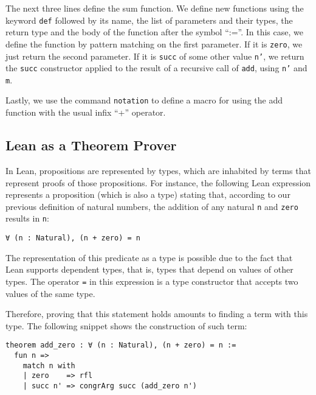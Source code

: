 The next three lines define the sum function. We define new functions using the keyword \texttt{def} followed by its name, the list of parameters and their types, the return type and the body of the function after the symbol ``:=''. In this case, we define the function by pattern matching on the first parameter. If it is \texttt{zero}, we just return the second parameter. If it is \texttt{succ} of some other value \texttt{n'}, we return the \texttt{succ} constructor applied to the result of a recursive call of \texttt{add}, using \texttt{n'} and \texttt{m}.

Lastly, we use the command \texttt{notation} to define a macro for using the add function with the usual infix ``+'' operator.



\subsection{Lean as a Theorem Prover}

In Lean, propositions are represented by types, which are inhabited by terms that represent proofs of those propositions. For instance, the following Lean expression represents a proposition (which is also a type) stating that, according to our previous definition of natural numbers, the addition of any natural \texttt{n} and \texttt{zero} results in \texttt{n}:

\begin{verbatim}
∀ (n : Natural), (n + zero) = n
\end{verbatim}

The representation of this predicate as a type is possible due to the fact that Lean supports dependent types, that is, types that depend on values of other types. The operator \texttt{=} in this expression is a type constructor that accepts two values of the same type.

Therefore, proving that this statement holds amounts to finding a term with this type. The following snippet shows the construction of such term:

\begin{verbatim}
theorem add_zero : ∀ (n : Natural), (n + zero) = n :=
  fun n =>
    match n with
    | zero    => rfl
    | succ n' => congrArg succ (add_zero n')
\end{verbatim}

